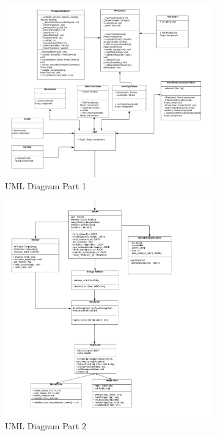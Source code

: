 \documentclass[12pt, titlepage]{article}
\begin{document}
\begin{center}
\begin{figure}[]
\includegraphics[width=0.8\textwidth, scale=1.5, keepaspectratio]{Design/SoftArchitecture/uml1.png}
\caption{UML Diagram Part 1}
\label{FigUH} 
\end{figure}
\end{center}

\begin{center}
\begin{figure}[]
\includegraphics[width=0.8\textwidth, scale=1.5, keepaspectratio]{Design/SoftArchitecture/uml2.png}
\caption{UML Diagram Part 2}
\label{FigUH} 
\end{figure}
\end{center}
\end{document}
